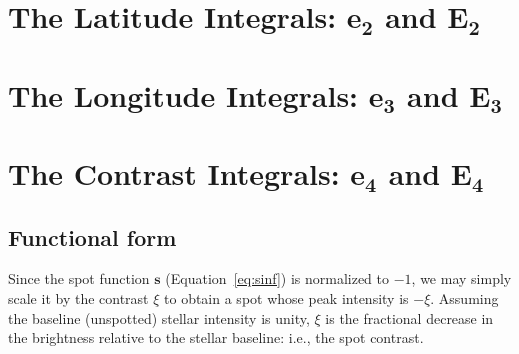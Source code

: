 \documentclass[modern]{aastex62}
\begin{document}
\section{The Latitude Integrals: \lowercase{$\mathbf{e_2}$} and $\mathbf{E_2}$}
\label{sec:latitude}

\section{The Longitude Integrals: \lowercase{$\mathbf{e_3}$} and $\mathbf{E_3}$}
\label{sec:longitude}

\section{The Contrast Integrals: \lowercase{$\mathbf{e_4}$} and $\mathbf{E_4}$}
\label{sec:contrast}
%
\subsection{Functional form}
\label{sec:contrast-function}
Since the spot function $\mathbf{s}$ (Equation~\ref{eq:sinf}) is normalized
to $-1$, we may simply scale it by the contrast $\xi$ to obtain a spot
whose peak intensity is $-\xi$.
Assuming the baseline (unspotted) stellar intensity is unity, $\xi$
is the fractional decrease in the brightness relative to the stellar
baseline: i.e., the spot contrast.
%
\end{document}
